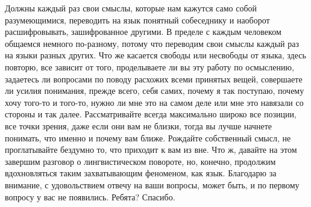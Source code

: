 Должны каждый раз свои смыслы, которые нам кажутся само собой разумеющимися,
переводить на язык понятный собеседнику и наоборот расшифровывать, зашифрованное
другими. В пределе с каждым человеком общаемся немного по-разному, потому что
переводим свои смыслы каждый раз на языки разных других. Что же касается свободы
или несвободы от языка, здесь повторю, все зависит от того, проделываете ли вы
эту работу по осмыслению, задаетесь ли вопросами по поводу расхожих всеми
принятых вещей, совершаете ли усилия понимания, прежде всего, себя самих, почему
я так поступаю, почему хочу того-то и того-то, нужно ли мне это на самом деле
или мне это навязали со стороны и так далее. Рассматривайте всегда максимально
широко все позиции, все точки зрения, даже если они вам не близки, тогда вы
лучше начнете понимать, что именно и почему вам ближе. Рождайте собственный
смысл, не проглатывайте бездумно то, что приходит к вам из вне. Что ж, давайте
на этом завершим разговор о лингвистическом повороте, но, конечно, продолжим
вдохновляться таким захватывающим феноменом, как язык. Благодарю за внимание, с
удовольствием отвечу на ваши вопросы, может быть, и по первому вопросу у вас не
появились. Ребята? Спасибо.
